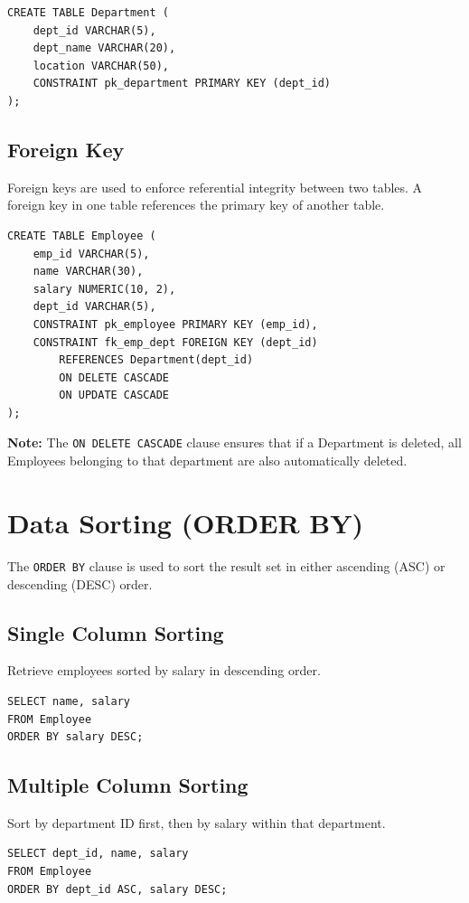 \documentclass[12pt,a4paper]{article}
\begin{document}
\begin{lstlisting}
CREATE TABLE Department (
    dept_id VARCHAR(5),
    dept_name VARCHAR(20),
    location VARCHAR(50),
    CONSTRAINT pk_department PRIMARY KEY (dept_id)
);
\end{lstlisting}

\subsection{Foreign Key}
Foreign keys are used to enforce referential integrity between two tables. A foreign key in one table references the primary key of another table.

\begin{lstlisting}
CREATE TABLE Employee (
    emp_id VARCHAR(5),
    name VARCHAR(30),
    salary NUMERIC(10, 2),
    dept_id VARCHAR(5),
    CONSTRAINT pk_employee PRIMARY KEY (emp_id),
    CONSTRAINT fk_emp_dept FOREIGN KEY (dept_id) 
        REFERENCES Department(dept_id)
        ON DELETE CASCADE
        ON UPDATE CASCADE
);
\end{lstlisting}

\textbf{Note:} The \texttt{ON DELETE CASCADE} clause ensures that if a Department is deleted, all Employees belonging to that department are also automatically deleted.

\section{Data Sorting (ORDER BY)}
The \texttt{ORDER BY} clause is used to sort the result set in either ascending (ASC) or descending (DESC) order.

\subsection{Single Column Sorting}
Retrieve employees sorted by salary in descending order.
\begin{lstlisting}
SELECT name, salary
FROM Employee
ORDER BY salary DESC;
\end{lstlisting}

\subsection{Multiple Column Sorting}
Sort by department ID first, then by salary within that department.
\begin{lstlisting}
SELECT dept_id, name, salary
FROM Employee
ORDER BY dept_id ASC, salary DESC;
\end{lstlisting}
\end{document}

